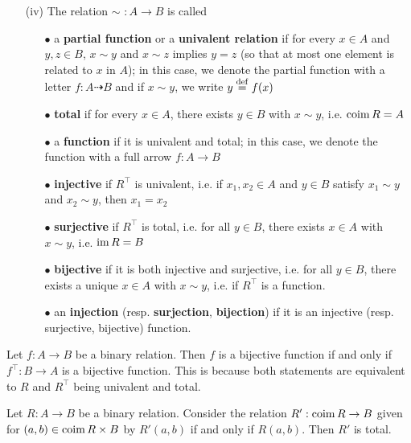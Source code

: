 \begin{definition}
\begin{itemize}
		\item[(iv)] The relation $\sim \,\,: A \to B$ is called
			\begin{itemize}
				\item[$\bullet$] a \textbf{partial function} or a \textbf{univalent relation} if for every $x \in A$ and $y,z \in B$, $x \sim y$ and $x \sim z$ implies $y=z$ (so that at most one element is related to $x$ in $A$); in this case, we denote the partial function with a letter $f: A \dashrightarrow B$ and if $x \sim y$, we write $y \overset{\mathrm{def}}{=} f(x)$ 
				\item[$\bullet$] \textbf{total} if for every $x \in A$, there exists $y \in B$ with $x \sim y$, i.e. $\operatorname{\mathrm{coim}} R = A$
				\item[$\bullet$] a \textbf{function} if it is univalent and total; in this case, we denote the function with a full arrow $f: A \to B$
				\item[$\bullet$] \textbf{injective} if $R^{\top}$ is univalent, i.e. if $x_1,x_2 \in A$ and $y \in B$ satisfy $x_1 \sim y$ and $x_2 \sim y$, then $x_1 = x_2$
				\item[$\bullet$] \textbf{surjective} if $R^{\top}$ is total, i.e. for all $y \in B$, there exists $x \in A$ with $x \sim y$, i.e. $\operatorname{\mathrm{im}} R = B$
				\item[$\bullet$] \textbf{bijective} if it is both injective and surjective, i.e. for all $y \in B$, there exists a unique $x \in A$ with $x \sim y$, i.e. if $R^{\top}$ is a function.
				\item[$\bullet$] an \textbf{injection} (resp. \textbf{surjection}, \textbf{bijection}) if it is an injective (resp. surjective, bijective) function.
				\\
			\end{itemize}
	\end{itemize}
\end{definition}

\begin{remark}
	Let $f : A \to B$ be a binary relation. Then $f$ is a bijective function if and only if $f^{\top} : B \to A$ is a bijective function. This is because both statements are equivalent to $R$ and $R^{\top}$ being univalent and total.
\end{remark}

\begin{lemma}
	Let $R: A \to B$ be a binary relation. Consider the relation $R' : \operatorname{\mathrm{coim}} R \to B$ given for $(a,b) \in \operatorname{\mathrm{coim}} R \times B$ by $R'(a,b)$ if and only if $R(a,b)$. Then $R'$ is total. 
\end{lemma}

